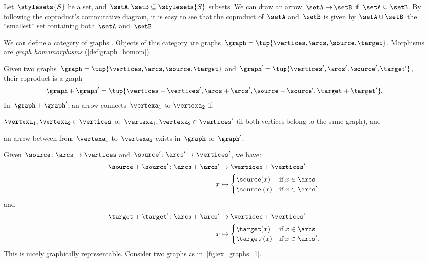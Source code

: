 \begin{example}
  \label{ex:subset_coprod}
  Let~$\stylesets{S}$ be a set, and~$\setA,\setB\subseteq \stylesets{S}$ subsets.
  We can draw an arrow~$\setA\to \setB$ if~$\setA\subseteq \setB$.
  By following the coproduct's commutative diagram, it is easy to see that the coproduct of~$\setA$ and~$\setB$ is given by~$\setA\cup\setB$: the ``smallest'' set containing both~$\setA$ and~$\setB$.
\end{example}


\begin{example}
  \label{def:ex_graph}
  We can define a category of graphs \iindex{\Graph}. Objects of this category are graphs~$\graph=\tup{\vertices,\arcs,\source,\target}$.
  Morphisms are \emph{graph homomorphisms} (\cref{def:graph_homom})

Given two graphs~$\graph=\tup{\vertices,\arcs,\source,\target}$ and~$\graph'=\tup{\vertices',\arcs',\source',\target'}$, their coproduct is a graph
  \begin{equation*}
    \graph+\graph'=\tup{\vertices+\vertices',\arcs+\arcs',\source+\source',\target+\target'}.
  \end{equation*}
  In~$\graph+\graph'$, an arrow connects~$\vertexa_1$ to $\vertexa_2$ if:
  \begin{compactitem}
    \item $\vertexa_1,\vertexa_2\in \vertices$ or~$\vertexa_1,\vertexa_2\in \vertices'$ (if both vertices belong to the same graph), and
    \item an arrow between from~$\vertexa_1$ to~$\vertexa_2$ exists in~$\graph$ or~$\graph'$.
  \end{compactitem}
  Given~$\source \colon \arcs \to \vertices$ and~$\source'\colon \arcs'\to \vertices'$, we have:
  \begin{equation*}
    \begin{aligned}
      \source+ \source'\colon \arcs+ \arcs'&\to \vertices+ \vertices'\\
      x&\mapsto
      \begin{cases}
        \source(x)& \text{if } x\in \arcs\\
        \source'(x)&\text{if } x\in \arcs'.
      \end{cases}
    \end{aligned}
  \end{equation*}
  and
  \begin{equation*}
    \begin{aligned}
      \target+\target '\colon \arcs+ \arcs '&\to \vertices+ \vertices'\\
      x&\mapsto
      \begin{cases}
        \target(x)& \text{if } x\in \arcs\\
        \target'(x)&\text{if } x\in \arcs'.
      \end{cases}
    \end{aligned}
  \end{equation*}
  This is nicely graphically representable. Consider two graphs as in~\cref{fig:ex_graphs_1}.


\end{example}
